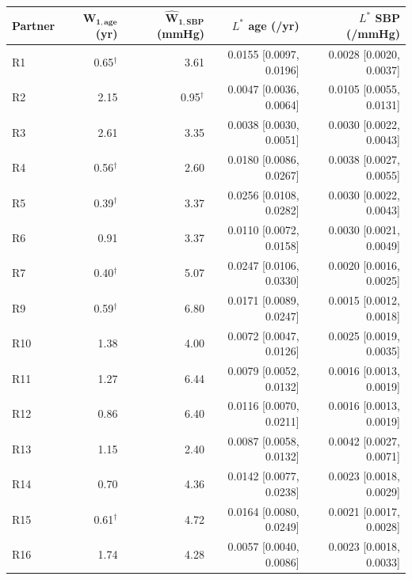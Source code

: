 \begin{tabular}{lrrrr}
\toprule
\textbf{Partner} & $\boldsymbol{\widehat{W}_{1,\text{age}}}$ \textbf{(yr)} & $\boldsymbol{\widehat{W}_{1,\text{SBP}}}$ \textbf{(mmHg)} & \textbf{$L^*$ age (/yr)} & \textbf{$L^*$ SBP (/mmHg)} \\
\midrule
R1 & 0.65$^\dagger$ & 3.61 & 0.0155 [0.0097, 0.0196] & 0.0028 [0.0020, 0.0037] \\
R2 & 2.15 & 0.95$^\dagger$ & 0.0047 [0.0036, 0.0064] & 0.0105 [0.0055, 0.0131] \\
R3 & 2.61 & 3.35 & 0.0038 [0.0030, 0.0051] & 0.0030 [0.0022, 0.0043] \\
R4 & 0.56$^\dagger$ & 2.60 & 0.0180 [0.0086, 0.0267] & 0.0038 [0.0027, 0.0055] \\
R5 & 0.39$^\dagger$ & 3.37 & 0.0256 [0.0108, 0.0282] & 0.0030 [0.0022, 0.0043] \\
R6 & 0.91 & 3.37 & 0.0110 [0.0072, 0.0158] & 0.0030 [0.0021, 0.0049] \\
R7 & 0.40$^\dagger$ & 5.07 & 0.0247 [0.0106, 0.0330] & 0.0020 [0.0016, 0.0025] \\
R9 & 0.59$^\dagger$ & 6.80 & 0.0171 [0.0089, 0.0247] & 0.0015 [0.0012, 0.0018] \\
R10 & 1.38 & 4.00 & 0.0072 [0.0047, 0.0126] & 0.0025 [0.0019, 0.0035] \\
R11 & 1.27 & 6.44 & 0.0079 [0.0052, 0.0132] & 0.0016 [0.0013, 0.0019] \\
R12 & 0.86 & 6.40 & 0.0116 [0.0070, 0.0211] & 0.0016 [0.0013, 0.0019] \\
R13 & 1.15 & 2.40 & 0.0087 [0.0058, 0.0132] & 0.0042 [0.0027, 0.0071] \\
R14 & 0.70 & 4.36 & 0.0142 [0.0077, 0.0238] & 0.0023 [0.0018, 0.0029] \\
R15 & 0.61$^\dagger$ & 4.72 & 0.0164 [0.0080, 0.0249] & 0.0021 [0.0017, 0.0028] \\
R16 & 1.74 & 4.28 & 0.0057 [0.0040, 0.0086] & 0.0023 [0.0018, 0.0033] \\
\bottomrule
\end{tabular}

